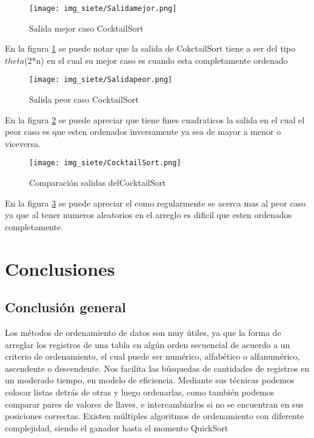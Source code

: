 \documentclass[12pt,twoside]{article}
\begin{document}
\begin{figure}[H]
\centering
\texttt{[image: img\_siete/Salidamejor.png]}
\caption{Salida mejor caso CocktailSort}
\label{Salidacockmejor}
\end{figure}

En la figura \ref{Salidacockmejor} se puede notar que la salida de CokctailSort tiene a ser del tipo $theta$(2*n) en el cual su mejor caso es cuando esta completamente ordenado

\begin{figure}[H]
\centering
\texttt{[image: img\_siete/Salidapeor.png]}
\caption{Salida peor caso CocktailSort}
\label{Salidacockpeor}
\end{figure}
En la figura \ref{Salidacockpeor} se puede apreciar que tiene fines cuadraticos la salida en el cual el peor caso es que esten ordenados inversamente ya sea de mayor a menor o viceversa.
\begin{figure}[H]
\centering
\texttt{[image: img\_siete/CocktailSort.png]}
\caption{Comparación salidas delCocktailSort}
\label{Salidascocktail}
\end{figure}

En la figura \ref{Salidascocktail} se puede apreciar el como regularmente se acerca mas al peor caso ya que al tener numeros aleatorios en el arreglo es dificil que esten ordenados completamente.
\vspace{50 mm}

\section{Conclusiones}
\subsection*{Conclusión general}
Los métodos de ordenamiento de datos son muy útiles, ya que la forma de arreglar los registros de una tabla en algún orden secuencial de acuerdo a un criterio de ordenamiento, el cual puede ser numérico, alfabético o alfanumérico, ascendente o descendente. Nos facilita las búsquedas de cantidades de registros en un moderado tiempo, en modelo de eficiencia. Mediante sus técnicas podemos colocar listas detrás de otras y luego ordenarlas, como también podemos comparar pares de valores de llaves, e intercambiarlos si no se encuentran en sus posiciones correctas.
\newline
Existen múltiples algoritmos de ordenamiento con diferente complejidad, siendo el ganador hasta el momento QuickSort
\end{document}
